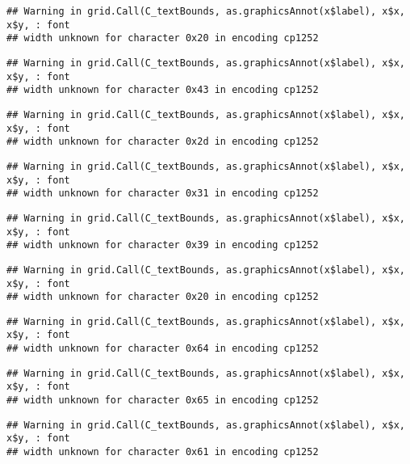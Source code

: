 \documentclass[
]{article}
\begin{document}
\begin{verbatim}
## Warning in grid.Call(C_textBounds, as.graphicsAnnot(x$label), x$x, x$y, : font
## width unknown for character 0x20 in encoding cp1252
\end{verbatim}

\begin{verbatim}
## Warning in grid.Call(C_textBounds, as.graphicsAnnot(x$label), x$x, x$y, : font
## width unknown for character 0x43 in encoding cp1252
\end{verbatim}

\begin{verbatim}
## Warning in grid.Call(C_textBounds, as.graphicsAnnot(x$label), x$x, x$y, : font
## width unknown for character 0x2d in encoding cp1252
\end{verbatim}

\begin{verbatim}
## Warning in grid.Call(C_textBounds, as.graphicsAnnot(x$label), x$x, x$y, : font
## width unknown for character 0x31 in encoding cp1252
\end{verbatim}

\begin{verbatim}
## Warning in grid.Call(C_textBounds, as.graphicsAnnot(x$label), x$x, x$y, : font
## width unknown for character 0x39 in encoding cp1252
\end{verbatim}

\begin{verbatim}
## Warning in grid.Call(C_textBounds, as.graphicsAnnot(x$label), x$x, x$y, : font
## width unknown for character 0x20 in encoding cp1252
\end{verbatim}

\begin{verbatim}
## Warning in grid.Call(C_textBounds, as.graphicsAnnot(x$label), x$x, x$y, : font
## width unknown for character 0x64 in encoding cp1252
\end{verbatim}

\begin{verbatim}
## Warning in grid.Call(C_textBounds, as.graphicsAnnot(x$label), x$x, x$y, : font
## width unknown for character 0x65 in encoding cp1252
\end{verbatim}

\begin{verbatim}
## Warning in grid.Call(C_textBounds, as.graphicsAnnot(x$label), x$x, x$y, : font
## width unknown for character 0x61 in encoding cp1252
\end{verbatim}
\end{document}
